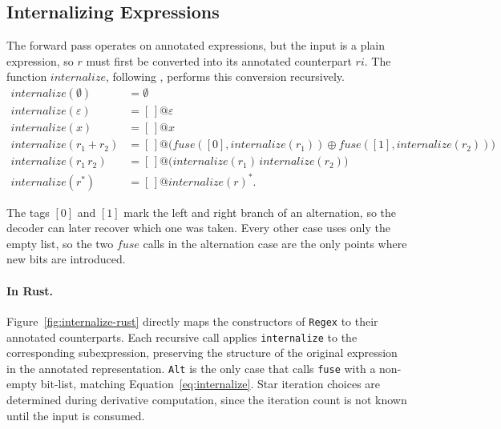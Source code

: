 %
%
%

\clearpage
\subsection{Internalizing Expressions}
\label{sec:internalize}

The forward pass operates on annotated expressions, but the input is a
plain expression, so $r$ must first be converted into its annotated
counterpart $\mathit{ri}$. The function $\mathit{internalize}$, following
\citep[Fig.~5]{sulzmannlu2014}, performs this conversion recursively.
\begin{equation}\label{eq:internalize}
\begin{aligned}
\mathit{internalize}(\emptyset) &= \emptyset \\
\mathit{internalize}(\varepsilon) &= [\,]@\varepsilon \\
\mathit{internalize}(x) &= [\,]@x \\
\mathit{internalize}(r_1+r_2) &=
  [\,]@\big(\mathit{fuse}([0],\mathit{internalize}(r_1))
  \oplus \mathit{fuse}([1],\mathit{internalize}(r_2))\big) \\
\mathit{internalize}(r_1\,r_2) &=
  [\,]@\big(\mathit{internalize}(r_1)\,\mathit{internalize}(r_2)\big) \\
\mathit{internalize}(r^{*}) &= [\,]@\mathit{internalize}(r)^{*}.
\end{aligned}
\end{equation}

The tags $[0]$ and $[1]$ mark the left and right branch of an alternation, 
so the decoder can later recover which one was taken. 
Every other case uses only the empty list, 
so the two $\mathit{fuse}$ calls in the alternation case 
are the only points where new bits are introduced.

%

\paragraph{In Rust.}
\label{sec:internalize-impl}

Figure~\ref{fig:internalize-rust} directly maps the constructors of
\texttt{Regex} to their annotated counterparts.
Each recursive call applies \texttt{internalize} to the corresponding subexpression, 
preserving the structure of the original expression in the annotated representation.
\texttt{Alt} is the only case that calls \texttt{fuse} with a non-empty bit-list, 
matching Equation~\eqref{eq:internalize}.
Star iteration choices are determined during derivative computation,
since the iteration count is not known until the input is consumed.

